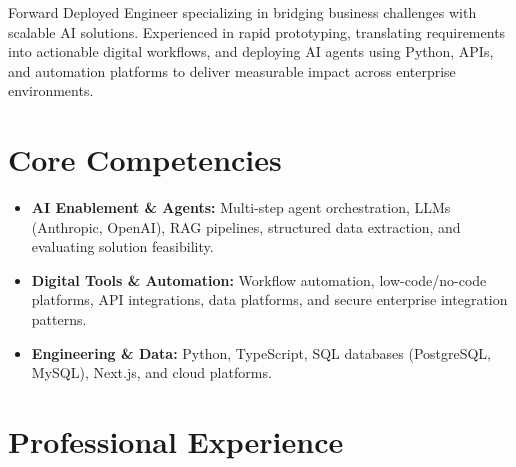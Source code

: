 \documentclass[11pt,a4paper,sans]{moderncv}
\begin{document}
\makecvtitle
\vspace{-15pt}

Forward Deployed Engineer specializing in bridging business challenges with scalable AI solutions. Experienced in rapid prototyping, translating requirements into actionable digital workflows, and deploying AI agents using Python, APIs, and automation platforms to deliver measurable impact across enterprise environments.

\section{Core Competencies}
\begin{itemize}
\item \textbf{AI Enablement \& Agents:} Multi-step agent orchestration, LLMs (Anthropic, OpenAI), RAG pipelines, structured data extraction, and evaluating solution feasibility.
\item \textbf{Digital Tools \& Automation:} Workflow automation, low-code/no-code platforms, API integrations, data platforms, and secure enterprise integration patterns.
\item \textbf{Engineering \& Data:} Python, TypeScript, SQL databases (PostgreSQL, MySQL), Next.js, and cloud platforms.
\end{itemize}

\section{Professional Experience}
\end{document}

